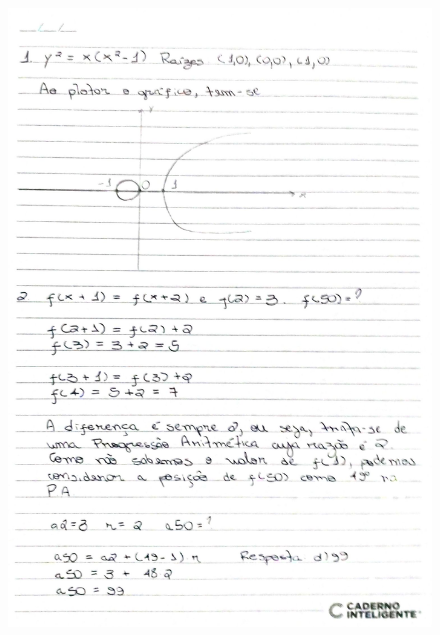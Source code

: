 \documentclass[
  12pt,     %
  openright,      %
  oneside,      %
  a4paper     %
  ]{abntex2}
\begin{document}
\begin{figure}[H]
  \centering
  \includegraphics[scale=0.23]{pagina11.jpg}
\end{figure}
\end{document}
